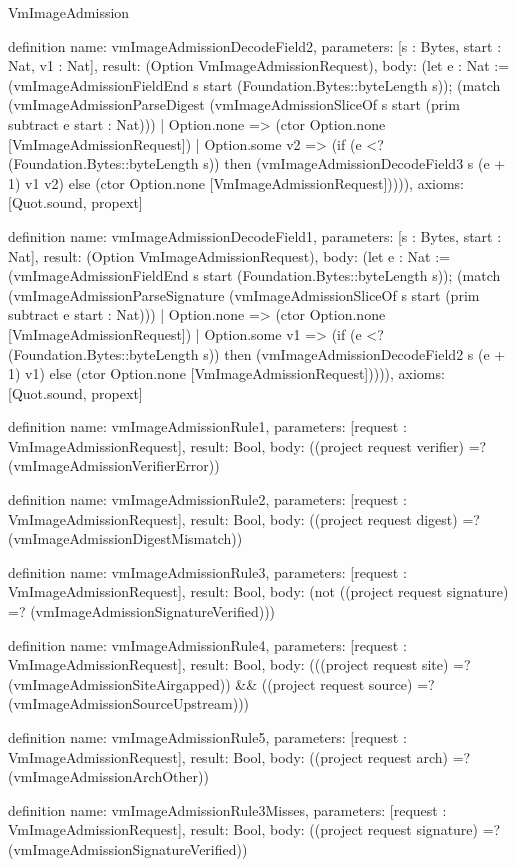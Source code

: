 \begin{lexlean}{VmImageAdmission}
\begin{semanticmodule}
definition{
  name: vmImageAdmissionDecodeField2,
  parameters: [s : Bytes, start : Nat, v1 : Nat],
  result: (Option VmImageAdmissionRequest),
  body: (let e : Nat := (vmImageAdmissionFieldEnd s start (Foundation.Bytes::byteLength s)); (match (vmImageAdmissionParseDigest (vmImageAdmissionSliceOf s start (prim subtract e start : Nat)))
    | Option.none => (ctor Option.none [VmImageAdmissionRequest])
    | Option.some v2 => (if (e <? (Foundation.Bytes::byteLength s)) then (vmImageAdmissionDecodeField3 s (e + 1) v1 v2) else (ctor Option.none [VmImageAdmissionRequest])))),
  axioms: [Quot.sound, propext]
}

definition{
  name: vmImageAdmissionDecodeField1,
  parameters: [s : Bytes, start : Nat],
  result: (Option VmImageAdmissionRequest),
  body: (let e : Nat := (vmImageAdmissionFieldEnd s start (Foundation.Bytes::byteLength s)); (match (vmImageAdmissionParseSignature (vmImageAdmissionSliceOf s start (prim subtract e start : Nat)))
    | Option.none => (ctor Option.none [VmImageAdmissionRequest])
    | Option.some v1 => (if (e <? (Foundation.Bytes::byteLength s)) then (vmImageAdmissionDecodeField2 s (e + 1) v1) else (ctor Option.none [VmImageAdmissionRequest])))),
  axioms: [Quot.sound, propext]
}

definition{
  name: vmImageAdmissionRule1,
  parameters: [request : VmImageAdmissionRequest],
  result: Bool,
  body: ((project request verifier) =? (vmImageAdmissionVerifierError))
}

definition{
  name: vmImageAdmissionRule2,
  parameters: [request : VmImageAdmissionRequest],
  result: Bool,
  body: ((project request digest) =? (vmImageAdmissionDigestMismatch))
}

definition{
  name: vmImageAdmissionRule3,
  parameters: [request : VmImageAdmissionRequest],
  result: Bool,
  body: (not ((project request signature) =? (vmImageAdmissionSignatureVerified)))
}

definition{
  name: vmImageAdmissionRule4,
  parameters: [request : VmImageAdmissionRequest],
  result: Bool,
  body: (((project request site) =? (vmImageAdmissionSiteAirgapped)) && ((project request source) =? (vmImageAdmissionSourceUpstream)))
}

definition{
  name: vmImageAdmissionRule5,
  parameters: [request : VmImageAdmissionRequest],
  result: Bool,
  body: ((project request arch) =? (vmImageAdmissionArchOther))
}

definition{
  name: vmImageAdmissionRule3Misses,
  parameters: [request : VmImageAdmissionRequest],
  result: Bool,
  body: ((project request signature) =? (vmImageAdmissionSignatureVerified))
}


\end{semanticmodule}
\end{lexlean}
